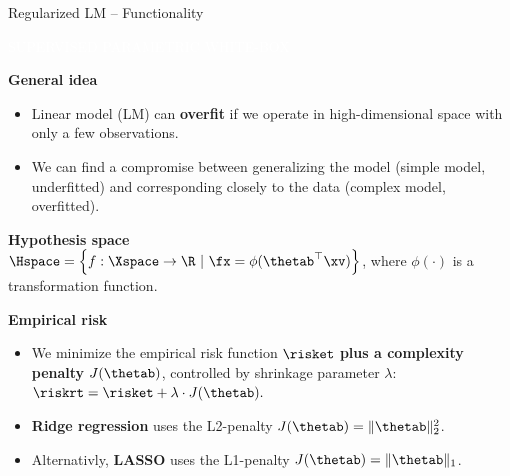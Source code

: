 \documentclass[11pt,compress,t,notes=noshow, xcolor=table]{beamer}
\newcommand{\maketag}[1]{\colorbox{highlightcol}{\textcolor{white}
{\MakeUppercase{#1}}}}
\newcommand{\highlight}[1]{\textcolor{highlightcol}{\textbf{#1}}}
\begin{document}
\begin{frame}{Regularized LM -- Functionality}

\footnotesize

\maketag{SUPERVISED}
\maketag{PARAMETRIC}
\maketag{WHITE-BOX}

\medskip

\highlight{General idea} ~~
\begin{itemize}

\item Linear model (LM) can \textbf{overfit} if we operate in high-dimensional space with only a few observations.


\item We can find a compromise between generalizing the model (simple model, underfitted) and corresponding closely to the data (complex model, overfitted).

\end{itemize}

\medskip

\highlight{Hypothesis space} ~~\\
$\Hspace = \left\{f: \Xspace \to \R ~|~\fx = \phi(\thetab^\top \xv)\right\}$, 
where $\phi(\cdot)$ is a transformation function.



\medskip


\footnotesize

\highlight{Empirical risk}

\begin{itemize}

\item We minimize the empirical risk function $\risket$ \textbf{plus a complexity penalty} $J(\thetab)$, controlled by shrinkage parameter $\lambda$: $\riskrt = \risket + \lambda \cdot J(\thetab).$ 
  
\item \textbf{Ridge regression} uses the L2-penalty  $J(\thetab) = \|\thetab\|_2^2 $. 

\item Alternativly, \textbf{LASSO} %
uses the L1-penalty $J(\thetab) = \|\thetab\|_1 $.



\end{itemize}
\end{frame}
\end{document}
